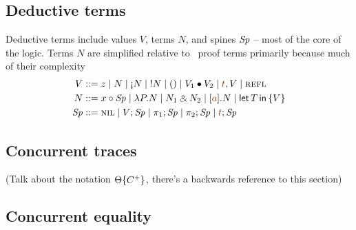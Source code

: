 \subsection{Deductive terms}
\label{sec:framework-deductive}

Deductive terms include values $V$, terms $N$, and spines ${\it Sp}$ --
most of the core of the logic. Terms $N$ are simplified relative
to \ollll~proof terms primarily because much of their complexity 
\begin{align*}
V & ::= z
   \mid N
   \mid \tgnabr{N}
   \mid \tbangr{N}
   \mid \toner
   \mid \tfuser{V_1}{V_2}
   \mid \texistsr{\lf{t}}{V}
   \mid \tunifr
\\
N & ::= \tfocusl{x}{\Sp} 
   \mid \lambda P.N 
   \mid N_1 \with N_2
   \mid \tforallr{\lf{a}}{N}
   \mid \tlet{T}{V}
\\
\Sp & ::= \tnil 
   \mid V; \Sp
   \mid \pi_1; \Sp 
   \mid \pi_2; \Sp
   \mid \lf{t}; \Sp
\end{align*}

\subsection{Concurrent traces}
\label{sec:framework-concurrent}
\label{sec:framework-substprop}


(Talk about the notation ${\Theta}\{{C^+}\}$, there's a backwards
reference to this section)


\subsection{Concurrent equality}
\label{sec:linconcurrenteq}
\label{sec:framework-concurrenteq}


